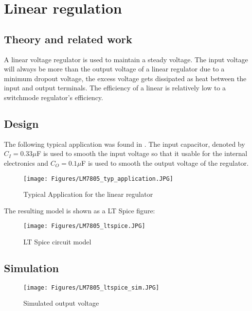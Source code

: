 \chapter{Linear regulation}
\section{Theory and related work} \label{sec:literature_linear}

A linear voltage regulator is used to maintain a steady voltage. The input voltage will always be more than the output voltage of a linear regulator due to a minimum dropout voltage, the excess voltage gets dissipated as heat between the input and output terminals. The efficiency of a linear is relatively low to a switchmode regulator's efficiency.

\section{Design} \label{sec:design_linear}

The following typical application was found in \cite{MC75VReg}.
The input capacitor, denoted by $C_{I} = 0.33 \mu$F is used to smooth the input voltage so that it usable for the internal electronics and $C_{O} = 0.1 \mu$F is used to smooth the output voltage of the regulator.

\begin{figure}[h]
    \centering
    \texttt{[image: Figures/LM7805\_typ\_application.JPG]}
    \caption{Typical Application for the linear regulator}
    \label{fig:linear_reg_application}
\end{figure}

The resulting model is shown as a LT Spice figure:

\begin{figure}[h]
    \centering
    \texttt{[image: Figures/LM7805\_ltspice.JPG]}
    \caption{LT Spice circuit model}
    \label{fig:linear_reg_application}
\end{figure}

\section{Simulation} \label{sec:simulation_linear}

\begin{figure}[h]
    \centering
    \texttt{[image: Figures/LM7805\_ltspice\_sim.JPG]}
    \caption{Simulated output voltage}
    \label{fig:5V_sim_output}
\end{figure}


